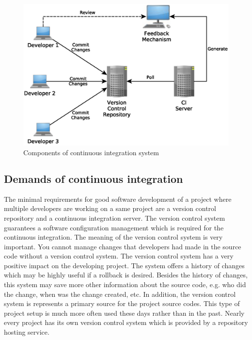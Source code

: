 \begin{figure}[H]
	\centering
	\includegraphics[scale=0.6]{yEd/components_of_CI_system.eps}
	\caption{Components of continuous integration system\cite{CI}}
	\label{fig:cocis}
\end{figure}

\subsection{Demands of continuous integration}
The minimal requirements for good software development of a project where multiple developers are working on a same project are a version control repository and a continuous integration server. The version control system guarantees a software configuration management which is required for the continuous integration. The meaning of the version control system is very important. You cannot manage changes that developers had made in the source code without a version control system. The version control system has a very positive impact on the developing project. The system offers a history of changes which may be highly useful if a rollback is desired. Besides the history of changes, this system may save more other information about the source code, e.g. who did the change, when was the change created, etc. In addition, the version control system is represents a primary source for the project source codes. This type of project setup is much more often used these days rather than in the past. Nearly every project has its own version control system which is provided by a repository hosting service.\\

